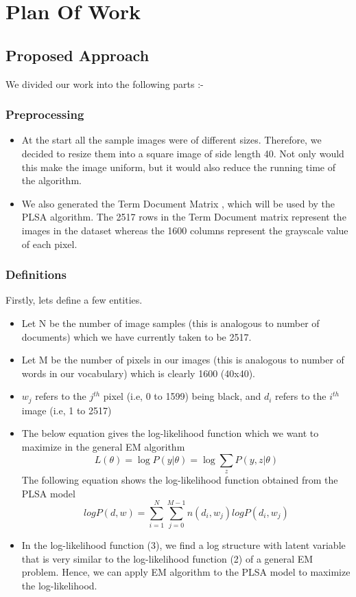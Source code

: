 \documentclass[10pt]{article}
\begin{document}
	\newpage
	\section{Plan Of Work}
	\hrulefill
	\subsection{Proposed Approach}
		\large We divided our work into the following parts :-
		\subsubsection{Preprocessing} 
			\begin{itemize}
				\item 
				At the start all the sample images were of different sizes. Therefore, we decided to resize them into a square image of side length 40. Not only would this make the image uniform, but it would also reduce the running time of the algorithm.
				\item
				We also generated the Term Document Matrix \cite{hoff1}, which will be used by the PLSA algorithm. The 2517 rows in the Term Document matrix represent the images in the dataset whereas the 1600 columns represent the grayscale value of each pixel.
			\end{itemize}
		\subsubsection{Definitions}
			Firstly, lets define a few entities. 
			\begin{itemize}
				\item 
				Let N be the number of image samples (this is analogous to number of documents) which we have currently taken to be 2517.
				\item
				Let M be the number of pixels in our images (this is analogous to number of words in our vocabulary) which is clearly 1600 (40x40).
				\item
				$w_j$ refers to the $j^{th}$ pixel (i.e, 0 to 1599) being black, and $d_i$ refers to the $i^{th}$
				image (i.e, 1 to 2517)
				\item 
				The below equation gives the log-likelihood function which we want to maximize in the general EM algorithm
				\begin{equation} 
				L(\theta) = \log P(y|\theta) = \log \sum_{z} P({y,z}|\theta)
				\end{equation}
				The following equation \cite{hoff2} shows the log-likelihood function obtained from the PLSA model
				\begin{equation}
					log P(d,w) = \sum_{i=1}^{N}\sum_{j=0}^{M-1}n(d_i,w_j)log P(d_i,w_j)
				\end{equation}
				\item
				In the log-likelihood function (3), we find a log structure with latent variable that is very similar to the log-likelihood function (2) of a general EM problem. Hence, we can apply EM algorithm to the PLSA model to maximize the log-likelihood.
			\end{itemize}
\end{document}
